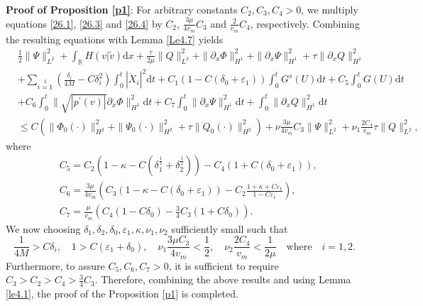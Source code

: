 \documentclass[10pt,reqno]{amsart}
\numberwithin{equation}{section}
\newcommand{\dif}{\mathrm{d}}
\begin{document}
{\bf{Proof of Proposition \ref{p1}}}: For arbitrary constants $C_2, C_3, C_4>0$, we multiply equations \eqref{26.1}, \eqref{26.3} and \eqref{26.4} by $C_2$, $\frac{3\mu}{4v_m}C_3$ and $\frac{2}{v_m}C_4$, respectively. Combining the resulting equations with Lemma \ref{Le4.7} yields
\begin{equation}\label{guan1-1}
\begin{aligned}
&\frac{1}{2}\|\Psi\|^2_{L^2}
+\int_{\mathbb R}H(v|\widetilde v)\dif x
 +\frac{\tau}{2\mu}\|Q\|^2_{L^2}+\|\partial_{x}\Phi\|^2_{H^1}+\|\partial_{x}\Psi\|^2_{H^1}+\tau\|\partial_{x}Q\|^2_{H^1}\\
&+\sum\limits_{i=1}\limits^2(\frac{\delta_i}{4M}-C\delta_i^2)\int_0^t|\dot{X}_i|^2\dif t+C_1(1-C(\delta_0+\varepsilon_1))\int_0^t G^s(U)
\dif t
+C_5\int_0^t
G(U)\dif t\\
&+C_6\int_0^t\|\sqrt{|p^\prime(v)|}\partial_{x}\Phi\|_{H^1}^2\dif t
+C_7\int_0^t\|\partial_{x}\Psi\|_{H^1}^2\dif t
+\int_0^t\|\partial_{x}Q\|_{H^1}^2\dif t\\
 &\leq C\left(\|\Phi_0(\cdot)\|^2_{H^2}+\|\Psi_0(\cdot)\|^2_{H^2}
 +\tau\|Q_0(\cdot)\|^2_{H^2}\right)
 +\nu\frac{3\mu}{4v_m}C_3\|\Psi\|_{L^2}^2+\nu_1\frac{2C_4}{v_m}\tau\|Q\|_{L^2}^2,
\end{aligned}
\end{equation}
	where \begin{align*}
	&	C_5=C_2(1-\kappa-C(\delta_1^{\frac{1}{2}}+\delta_2^{\frac{1}{2}}))-C_4(1+C(\delta_0+\varepsilon_1)),\\
	&C_6=\frac{3\mu}{4v_m}\left(C_3(1-\kappa-C(\delta_0+\varepsilon_1))-C_2\frac{1+\kappa+C\varepsilon_1}{1-C\varepsilon_1}\right),\\
	&C_7=\frac{\mu}{v_m}\left(C_4(1-C\delta_0)-\frac{3}{4}C_3(1+C\delta_0)\right).
\end{align*}  
We now choosing $\delta_1, \delta_2, \delta_0, \varepsilon_1, \kappa, \nu_1, \nu_2$ sufficiently small such that 
\[\frac{1}{4M}>C\delta_i,\quad 1>C(\varepsilon_1+\delta_0),\quad  \nu_1\frac{3\mu C_3}{4v_m}<\frac{1}{2},\quad \nu_2\frac{2C_4}{v_m}<\frac{1}{2\mu} \quad \text{where}\quad i=1,2.\] 
Furthermore, to assure $C_5, C_6, C_7>0$, it is sufficient to require $C_3>C_2>C_4>\frac{3}{4}C_3$. Therefore, combining the above results and using Lemma \ref{le4.1}, the proof of the Proposition \ref{p1} is completed.
\end{document}
